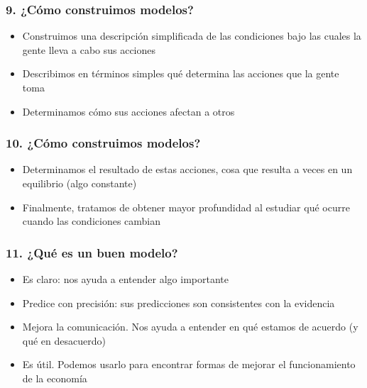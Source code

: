 \documentclass{beamer}
\begin{document}
\begin{frame}
\frametitle{9. ¿Cómo construimos modelos?}
\begin{itemize}
    \item Construimos una descripción simplificada de las condiciones bajo las cuales la gente lleva a cabo sus acciones \vspace{2mm}
    \item Describimos en términos simples qué determina las acciones que la gente toma \vspace{2mm}
    \item Determinamos cómo sus acciones afectan a otros
\end{itemize} 
\end{frame}

\begin{frame}
\frametitle{10. ¿Cómo construimos modelos?}
\begin{itemize}
    \item Determinamos el resultado de estas acciones, cosa que resulta a veces en un equilibrio (algo constante) \vspace{2mm}
    \item Finalmente, tratamos de obtener mayor profundidad al estudiar qué ocurre cuando las condiciones cambian 
\end{itemize} 
\end{frame}

\begin{frame}
\frametitle{11. ¿Qué es un buen modelo?}
\begin{itemize}
    \item Es claro: nos ayuda a entender algo importante
    \item Predice con precisión: sus predicciones son consistentes con la evidencia \vspace{1mm}
    \item Mejora la comunicación. Nos ayuda a entender en qué estamos de acuerdo (y qué en desacuerdo) \vspace{1mm}
    \item Es útil. Podemos usarlo para encontrar formas de mejorar el funcionamiento de la economía
\end{itemize} 
\end{frame}
\end{document}
